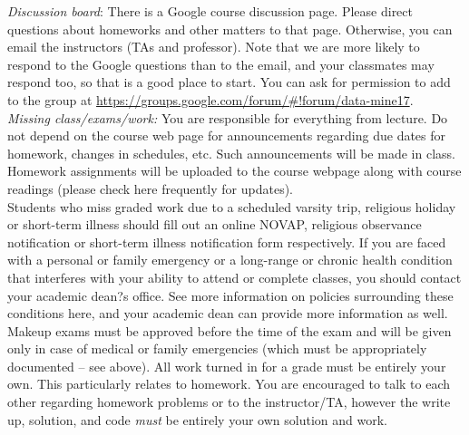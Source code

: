 \documentclass[11pt]{article}
\begin{document}
\emph{Discussion board}:
There is a Google course discussion page. Please direct questions about homeworks and other matters to that page. Otherwise, you can email the instructors (TAs and professor). Note that we are more likely to respond to the Google questions than to the email, and your classmates may respond too, so that is a good place to start. You can ask for permission to add to the group at \url{https://groups.google.com/forum/#!forum/data-mine17}.\\



\emph{Missing class/exams/work:}
You are responsible for everything from lecture. Do not depend on the course web page for announcements regarding due dates for homework, changes in schedules, etc. Such announcements will be made in class. Homework assignments will be uploaded to the course webpage along with course readings (please check here frequently for updates).\\

Students who miss graded work due to a scheduled varsity trip, religious holiday or short-term illness should fill out an online NOVAP, religious observance notification or short-term illness notification form respectively. If you are faced with a personal or family emergency or a long-range or chronic health condition that interferes with your ability to attend or complete classes, you should contact your academic dean?s office. See more information on policies surrounding these conditions here, and your academic dean can provide more information as well.\\

Makeup exams must be approved before the time of the exam and will be given only in case
of medical or family emergencies (which must be appropriately documented -- see above). All work turned in for a grade must be entirely your own. This particularly relates to homework. You are encouraged to talk to each other regarding homework problems or to the instructor/TA, however the write up, solution, and code \emph{must} be entirely your own solution and work. \\
\end{document}
